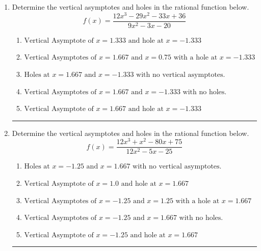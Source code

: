 \documentclass[14pt]{extbook}
\newcommand{\litem}[1]{\item#1\hspace*{-1cm}\rule{\textwidth}{0.4pt}}
\begin{document}
\begin{enumerate}
{\begin{enumerate}[label=\Alph*.]
\end{enumerate} }
\litem{
Determine the vertical asymptotes and holes in the rational function below.\[ f(x) = \frac{12x^{3} -29 x^{2} -33 x + 36}{9x^{2} -3 x -20} \]\begin{enumerate}[label=\Alph*.]
\item \( \text{Vertical Asymptote of } x = 1.333 \text{ and hole at } x = -1.333 \)
\item \( \text{Vertical Asymptotes of } x = 1.667 \text{ and } x = 0.75 \text{ with a hole at } x = -1.333 \)
\item \( \text{Holes at } x = 1.667 \text{ and } x = -1.333 \text{ with no vertical asymptotes.} \)
\item \( \text{Vertical Asymptotes of } x = 1.667 \text{ and } x = -1.333 \text{ with no holes.} \)
\item \( \text{Vertical Asymptote of } x = 1.667 \text{ and hole at } x = -1.333 \)

\end{enumerate} }
\litem{
Determine the vertical asymptotes and holes in the rational function below.\[ f(x) = \frac{12x^{3} + x^{2} -80 x + 75}{12x^{2} -5 x -25} \]\begin{enumerate}[label=\Alph*.]
\item \( \text{Holes at } x = -1.25 \text{ and } x = 1.667 \text{ with no vertical asymptotes.} \)
\item \( \text{Vertical Asymptote of } x = 1.0 \text{ and hole at } x = 1.667 \)
\item \( \text{Vertical Asymptotes of } x = -1.25 \text{ and } x = 1.25 \text{ with a hole at } x = 1.667 \)
\item \( \text{Vertical Asymptotes of } x = -1.25 \text{ and } x = 1.667 \text{ with no holes.} \)
\item \( \text{Vertical Asymptote of } x = -1.25 \text{ and hole at } x = 1.667 \)


\end{enumerate}}
\end{enumerate}
\end{document}
